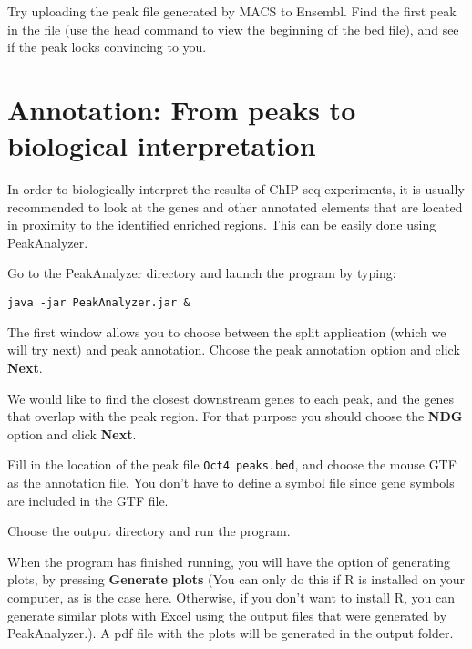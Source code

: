 \begin{advanced}
Try uploading the peak file generated by MACS to Ensembl. Find the first peak in
the file (use the head command to view the beginning of the bed file), and see
if the peak looks convincing to you.
\end{advanced}


\section{Annotation: From peaks to biological interpretation}

\begin{information}
In order to biologically interpret the results of ChIP-seq experiments, it is
usually recommended to look at the genes and other annotated elements that are
located in proximity to the identified enriched regions. This can be easily done
using PeakAnalyzer.
\end{information}

\begin{steps}
Go to the PeakAnalyzer directory and launch the program by typing:
\begin{lstlisting}
java -jar PeakAnalyzer.jar &
\end{lstlisting}

The first window allows you to choose between the split application (which we
will try next) and peak annotation. Choose the peak annotation option and click
\textbf{Next}.

We would like to find the closest downstream genes to each peak, and the genes
that overlap with the peak region. For that purpose you should choose the
\textbf{NDG} option and click \textbf{Next}.

Fill in the location of the peak file \texttt{Oct4 peaks.bed}, and choose the mouse GTF
as the annotation file. You don't have to define a symbol file since gene
symbols are included in the GTF file.

Choose the output directory and run the program.
\end{steps}

\begin{information}
When the program has finished running, you will have the option of generating
plots, by pressing \textbf{Generate plots} (You can only do this if R is
installed on your computer, as is the case here. Otherwise, if you don't want to
install R, you can generate similar plots with Excel using the output files that
were generated by PeakAnalyzer.). A pdf file with the plots will be generated in
the output folder.
\end{information}

